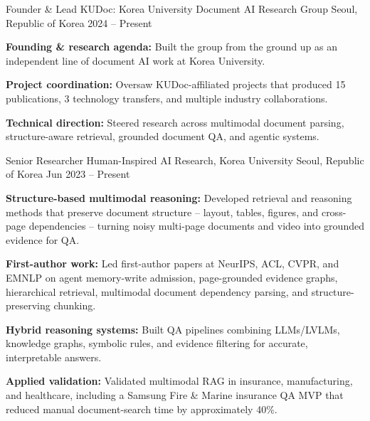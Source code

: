 \documentclass[11pt, a4paper]{awesome-cv}
\begin{document}

\begin{cventries}
  \cventry
    {Founder \& Lead}
    {KUDoc: Korea University Document AI Research Group}
    {Seoul, Republic of Korea}
    {2024 -- Present}
    {
      \begin{cvitems}
        \item {\textbf{Founding \& research agenda:} Built the group from the ground up as an independent line of document AI work at Korea University.}
        \item {\textbf{Project coordination:} Oversaw KUDoc-affiliated projects that produced 15 publications, 3 technology transfers, and multiple industry collaborations.}
        \item {\textbf{Technical direction:} Steered research across multimodal document parsing, structure-aware retrieval, grounded document QA, and agentic systems.}
      \end{cvitems}
    }\par
  \cventry
    {Senior Researcher}
    {Human-Inspired AI Research, Korea University}
    {Seoul, Republic of Korea}
    {Jun 2023 -- Present}
    {
      \begin{cvitems}
        \item {\textbf{Structure-based multimodal reasoning:} Developed retrieval and reasoning methods that preserve document structure -- layout, tables, figures, and cross-page dependencies -- turning noisy multi-page documents and video into grounded evidence for QA.}
        \item {\textbf{First-author work:} Led first-author papers at NeurIPS, ACL, CVPR, and EMNLP on agent memory-write admission, page-grounded evidence graphs, hierarchical retrieval, multimodal document dependency parsing, and structure-preserving chunking.}
        \item {\textbf{Hybrid reasoning systems:} Built QA pipelines combining LLMs/LVLMs, knowledge graphs, symbolic rules, and evidence filtering for accurate, interpretable answers.}
        \item {\textbf{Applied validation:} Validated multimodal RAG in insurance, manufacturing, and healthcare, including a Samsung Fire \& Marine insurance QA MVP that reduced manual document-search time by approximately 40\%.}
      \end{cvitems}
    }\par

\end{cventries}
\end{document}
